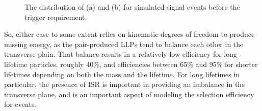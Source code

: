 \begin{figure}[h]
\centering
{}
\caption{The distribution of (a) \met and (b) \calomet for simulated signal events before the trigger requirement.}
\label{fig:trigger_met}
\end{figure}

So, either case to some extent relies on kinematic degrees of freedom to produce missing energy, as the pair-produced \acp{LLP} tend to balance each other in the transverse plain.
That balance results in a relatively low efficiency for long-lifetime particles, roughly 40\%, and efficiencies between 65\% and 95\% for shorter lifetimes depending on both the mass and the lifetime.
For long lifetimes in particular, the presence of \ac{ISR} is important in providing an imbalance in the transverse plane, and is an important aspect of modeling the selection efficiency for \rhadron events.

